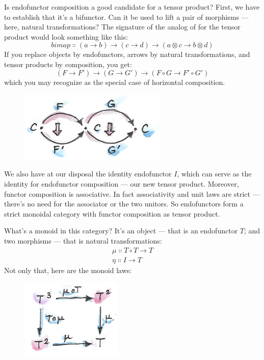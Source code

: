 Is endofunctor composition a good candidate for a tensor product? First,
we have to establish that it's a bifunctor. Can it be used to lift a
pair of morphisms --- here, natural transformations? The signature of
the analog of  for the tensor product would look something
like this:
\[bimap \Colon (a \to b) \to (c \to d) \to (a \otimes c \to b \otimes d)\]
If you replace objects by endofunctors, arrows by natural
transformations, and tensor products by composition, you get:
\[(F \to F') \to (G \to G') \to (F \circ G \to F' \circ G')\]
which you may recognize as the special case of horizontal composition.

\begin{figure}[H]
\centering
\includegraphics[width=70mm]{images/horizcomp.png}
\end{figure}

\noindent
We also have at our disposal the identity endofunctor $I$, which
can serve as the identity for endofunctor composition --- our new tensor
product. Moreover, functor composition is associative. In fact
associativity and unit laws are strict --- there's no need for the
associator or the two unitors. So endofunctors form a strict monoidal
category with functor composition as tensor product.

What's a monoid in this category? It's an object --- that is an
endofunctor $T$; and two morphisms --- that is natural
transformations:
\begin{gather*}
\mu \Colon T \circ T \to T \\
\eta \Colon I \to T
\end{gather*}
Not only that, here are the monoid laws:

\begin{figure}[H]
\centering
\includegraphics[width=1.90625in]{images/assoc.png}
\end{figure}


